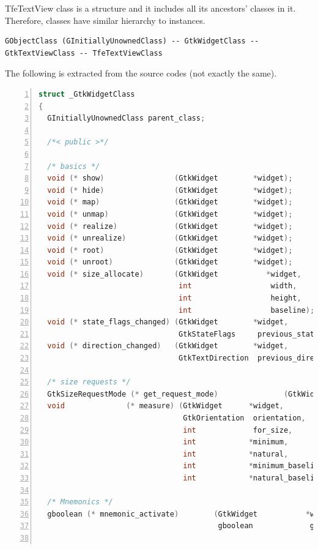 TfeTextView class is a structure and it includes all its ancestors'
classes in it. Therefore, classes have similar hierarchy to instances.

\begin{lstlisting}
GObjectClass (GInitiallyUnownedClass) -- GtkWidgetClass -- GtkTextViewClass -- TfeTextViewClass
\end{lstlisting}

The following is extracted from the source codes (not exactly the same).

\begin{lstlisting}[language=C, numbers=left]
struct _GtkWidgetClass
{
  GInitiallyUnownedClass parent_class;

  /*< public >*/

  /* basics */
  void (* show)                (GtkWidget        *widget);
  void (* hide)                (GtkWidget        *widget);
  void (* map)                 (GtkWidget        *widget);
  void (* unmap)               (GtkWidget        *widget);
  void (* realize)             (GtkWidget        *widget);
  void (* unrealize)           (GtkWidget        *widget);
  void (* root)                (GtkWidget        *widget);
  void (* unroot)              (GtkWidget        *widget);
  void (* size_allocate)       (GtkWidget           *widget,
                                int                  width,
                                int                  height,
                                int                  baseline);
  void (* state_flags_changed) (GtkWidget        *widget,
                                GtkStateFlags     previous_state_flags);
  void (* direction_changed)   (GtkWidget        *widget,
                                GtkTextDirection  previous_direction);

  /* size requests */
  GtkSizeRequestMode (* get_request_mode)               (GtkWidget      *widget);
  void              (* measure) (GtkWidget      *widget,
                                 GtkOrientation  orientation,
                                 int             for_size,
                                 int            *minimum,
                                 int            *natural,
                                 int            *minimum_baseline,
                                 int            *natural_baseline);

  /* Mnemonics */
  gboolean (* mnemonic_activate)        (GtkWidget           *widget,
                                         gboolean             group_cycling);


\end{lstlisting}

